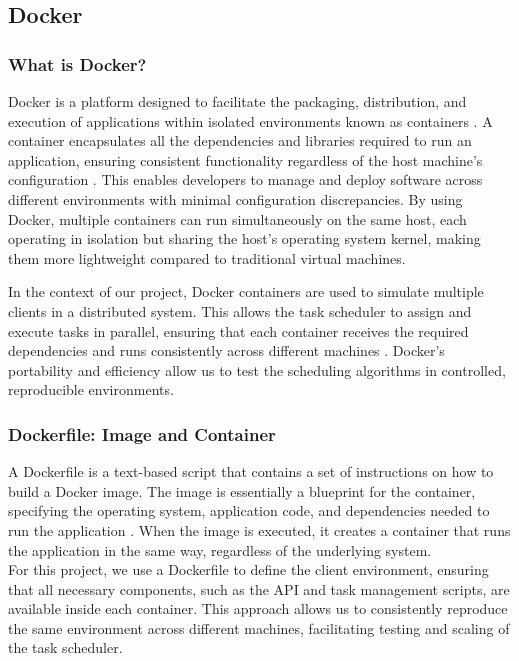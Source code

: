 \documentclass{article}
\begin{document}
\subsection{Docker}
\subsubsection{What is Docker?}

Docker is a platform designed to facilitate the packaging, distribution, and execution of applications within isolated environments known as containers \cite{Docker, n.d.}. A container encapsulates all the dependencies and libraries required to run an application, ensuring consistent functionality regardless of the host machine’s configuration \cite{Docker, n.d.}. This enables developers to manage and deploy software across different environments with minimal configuration discrepancies. By using Docker, multiple containers can run simultaneously on the same host, each operating in isolation but sharing the host’s operating system kernel, making them more lightweight compared to traditional virtual machines.

In the context of our project, Docker containers are used to simulate multiple clients in a distributed system. This allows the task scheduler to assign and execute tasks in parallel, ensuring that each container receives the required dependencies and runs consistently across different machines \cite{Merkel for Linux Journal, 2014}. Docker’s portability and efficiency allow us to test the scheduling algorithms in controlled, reproducible environments.

\subsubsection{Dockerfile: Image and Container}
A Dockerfile is a text-based script that contains a set of instructions on how to build a Docker image. The image is essentially a blueprint for the container, specifying the operating system, application code, and dependencies needed to run the application \cite{Docker, n.d.}. When the image is executed, it creates a container that runs the application in the same way, regardless of the underlying system.\\

For this project, we use a Dockerfile to define the client environment, ensuring that all necessary components, such as the API and task management scripts, are available inside each container. This approach allows us to consistently reproduce the same environment across different machines, facilitating testing and scaling of the task scheduler.
\end{document}
